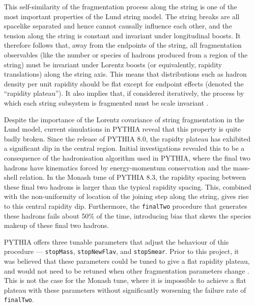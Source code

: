 \documentclass[12pt,a4paper]{report}
\begin{document}
This self-similarity of the fragmentation process along the string is one of the most important properties of the Lund string model. The string breaks are all spacelike separated and hence cannot causally influence each other, and the tension along the string is constant and invariant under longitudinal boosts. It therefore follows that, away from the endpoints of the string, all fragmentation observables (like the number or species of hadrons produced from a region of the string) must be invariant under Lorentz boosts (or equivalently, rapidity translations) along the string axis. This means that distributions such as hadron density per unit rapidity should be flat except for endpoint effects (denoted the ``rapidity plateau''). It also implies that, if considered iteratively, the process by which each string subsystem is fragmented must be scale invariant \cite{Andersson:1983ia,Andersson:1997xwk,Bierlich:2022pfr}.

Despite the importance of the Lorentz covariance of string fragmentation in the Lund model, current simulations in PYTHIA reveal that this property is quite badly broken. Since the release of PYTHIA 8.0, the rapidty plateau has exhibited a significant dip in the central region. Initial investigations revealed this to be a consequence of the hadronisation algorithm used in PYTHIA, where the final two hadrons have kinematics forced by energy-momentum conservation and the mass-shell relation. In the Monash tune of PYTHIA 8.3, the rapidity spacing between these final two hadrons is larger than the typical rapidity spacing. This, combined with the non-uniformity of location of the joining step along the string, gives rise to this central rapidity dip. Furthermore, the \texttt{finalTwo} procedure that generates these hadrons fails about 50\% of the time, introducing bias that skews the species makeup of these final two hadrons.

PYTHIA offers three tunable parameters that adjust the behaviour of this procedure --- \texttt{stopMass}, \texttt{stopNewFlav}, and \texttt{stopSmear}. Prior to this project, it was believed that these parameters could be tuned to give a flat rapidity plateau, and would not need to be retuned when other fragmentation parameters change \cite{Bierlich:2022pfr,Sjostrand:2006za}. This is not the case for the Monash tune, where it is impossible to achieve a flat plateau with these parameters without significantly worsening the failure rate of \texttt{finalTwo}.
\end{document}

